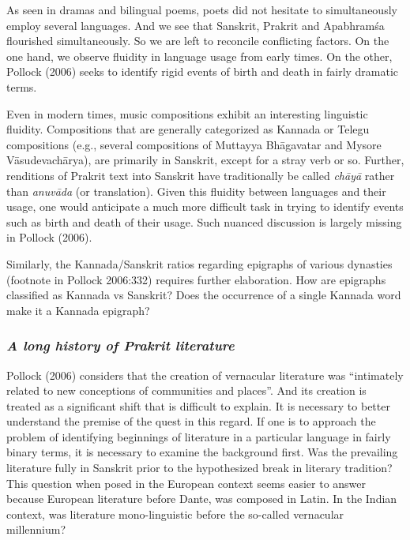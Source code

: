 As seen in dramas and bilingual poems, poets did not hesitate to simultaneously employ several languages. And we see that Sanskrit, Prakrit and Apabhramśa flourished simultaneously. So we are left to reconcile conflicting factors. On the one hand, we observe fluidity in language usage from early times. On the other, Pollock (2006) seeks to identify rigid events of birth and death in fairly dramatic terms. 

Even in modern times, music compositions exhibit an interesting linguistic fluidity. Compositions that are generally categorized as Kannada or Telegu compositions (e.g., several compositions of Muttayya Bhāgavatar and Mysore Vāsudevachārya), are primarily in Sanskrit, except for a stray verb or so. Further, renditions of Prakrit text into Sanskrit have traditionally be called {\sl chāyā} rather than {\sl anuvāda} (or translation). Given this fluidity between languages and their usage, one would anticipate a much more difficult task in trying to identify events such as birth and death of their usage. Such nuanced discussion is largely missing in Pollock (2006). 

Similarly, the Kannada/Sanskrit ratios regarding epigraphs of various dynasties (footnote in Pollock 2006:332) requires further elaboration. How are epigraphs classified as Kannada vs Sanskrit? Does the occurrence of a single Kannada word make it a Kannada epigraph?
\vskip -40pt

\subsubsection{{\sl A long history of Prakrit literature}}
\vskip -5pt

Pollock (2006) considers that the creation of vernacular literature was “intimately related to new conceptions of communities and places”. And its creation is treated as a significant shift that is difficult to explain. It is necessary to better understand the premise of the quest in this regard. If one is to approach the problem of identifying beginnings of literature in a particular language in fairly binary terms, it is necessary to examine the background first. Was the prevailing literature fully in Sanskrit prior to the hypothesized break in literary tradition? This question when posed in the European context seems easier to answer because European literature before Dante, was composed in Latin.  In the Indian context, was literature mono-linguistic before the so-called vernacular millennium?

